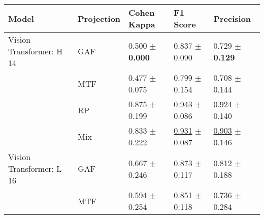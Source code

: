 
\begin{tabular}[t]{lllll}
\toprule
Model & Projection & Cohen Kappa & F1 Score & Precision \\
\midrule
Vision Transformer: H 14 & GAF & \textcolor[rgb]{0.9482758621,0.0517241379,0}{0.500} $\pm$ \textbf{\textcolor[rgb]{0.0000000000,0.5000000000,0}{0.000}} & \textcolor[rgb]{0.7551020408,0.2448979592,0}{0.837} $\pm$ \textcolor[rgb]{0.0917026964,0.5000000000,0}{0.090} & \textcolor[rgb]{0.9117647059,0.0882352941,0}{0.729} $\pm$ \textbf{\textcolor[rgb]{0.0000000000,0.5000000000,0}{0.129}} \\
 & MTF & \textcolor[rgb]{1.0000000000,0.0000000000,0}{0.477} $\pm$ \textcolor[rgb]{0.2928862697,0.5000000000,0}{0.075} & \textcolor[rgb]{1.0000000000,0.0000000000,0}{0.799} $\pm$ \textcolor[rgb]{1.0000000000,0.0000000000,0}{0.154} & \textcolor[rgb]{1.0000000000,0.0000000000,0}{0.708} $\pm$ \textcolor[rgb]{0.1005729181,0.5000000000,0}{0.144} \\
 & RP & \textcolor[rgb]{0.0948275862,0.5000000000,0}{0.875} $\pm$ \textcolor[rgb]{0.7749042320,0.2250957680,0}{0.199} & \underline{\textcolor[rgb]{0.0765306122,0.5000000000,0}{0.943}} $\pm$ \textcolor[rgb]{0.0436410935,0.5000000000,0}{0.086} & \underline{\textcolor[rgb]{0.0882352941,0.5000000000,0}{0.924}} $\pm$ \textcolor[rgb]{0.0707312682,0.5000000000,0}{0.140} \\
 & Mix & \textcolor[rgb]{0.1896551724,0.5000000000,0}{0.833} $\pm$ \textcolor[rgb]{0.8622338316,0.1377661684,0}{0.222} & \underline{\textcolor[rgb]{0.1530612245,0.5000000000,0}{0.931}} $\pm$ \textcolor[rgb]{0.0611600708,0.5000000000,0}{0.087} & \underline{\textcolor[rgb]{0.1764705882,0.5000000000,0}{0.903}} $\pm$ \textcolor[rgb]{0.1099220919,0.5000000000,0}{0.146} \\
Vision Transformer: L 16 & GAF & \textcolor[rgb]{0.5689655172,0.4310344828,0}{0.667} $\pm$ \textcolor[rgb]{0.9565625511,0.0434374489,0}{0.246} & \textcolor[rgb]{0.5255102041,0.4744897959,0}{0.873} $\pm$ \textcolor[rgb]{0.4802417507,0.5000000000,0}{0.117} & \textcolor[rgb]{0.5588235294,0.4411764706,0}{0.812} $\pm$ \textcolor[rgb]{0.3848316167,0.5000000000,0}{0.188} \\
 & MTF & \textcolor[rgb]{0.7344827586,0.2655172414,0}{0.594} $\pm$ \textcolor[rgb]{0.9873545177,0.0126454823,0}{0.254} & \textcolor[rgb]{0.6665120594,0.3334879406,0}{0.851} $\pm$ \textcolor[rgb]{0.4950603212,0.5000000000,0}{0.118} & \textcolor[rgb]{0.8823529412,0.1176470588,0}{0.736} $\pm$ \textcolor[rgb]{1.0000000000,0.0000000000,0}{0.284} \\

\end{tabular}
